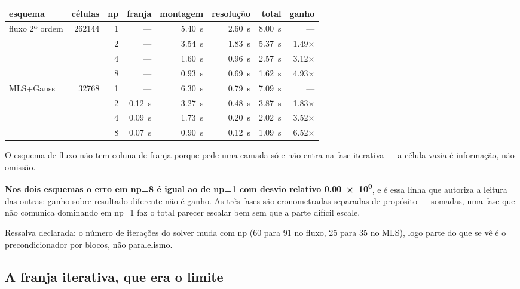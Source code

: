\begin{center}
\begin{tabular}{lrrrrrrr}
\toprule
esquema & células & np & franja & montagem & resolução & total & ganho \\
\midrule
fluxo 2ª ordem & \num{262144} & 1 & --- & \SI{5.40}{\second} & \SI{2.60}{\second} & \SI{8.00}{\second} & --- \\
               &              & 2 & --- & \SI{3.54}{\second} & \SI{1.83}{\second} & \SI{5.37}{\second} & \num{1.49}$\times$ \\
               &              & 4 & --- & \SI{1.60}{\second} & \SI{0.96}{\second} & \SI{2.57}{\second} & \num{3.12}$\times$ \\
               &              & 8 & --- & \SI{0.93}{\second} & \SI{0.69}{\second} & \SI{1.62}{\second} & \num{4.93}$\times$ \\
\midrule
MLS+Gauss      & \num{32768}  & 1 & --- & \SI{6.30}{\second} & \SI{0.79}{\second} & \SI{7.09}{\second} & --- \\
               &              & 2 & \SI{0.12}{\second} & \SI{3.27}{\second} & \SI{0.48}{\second} & \SI{3.87}{\second} & \num{1.83}$\times$ \\
               &              & 4 & \SI{0.09}{\second} & \SI{1.73}{\second} & \SI{0.20}{\second} & \SI{2.02}{\second} & \num{3.52}$\times$ \\
               &              & 8 & \SI{0.07}{\second} & \SI{0.90}{\second} & \SI{0.12}{\second} & \SI{1.09}{\second} & \num{6.52}$\times$ \\
\bottomrule
\end{tabular}
\end{center}

O esquema de fluxo não tem coluna de franja porque pede uma camada só e não
entra na fase iterativa --- a célula vazia é informação, não omissão.

\textbf{Nos dois esquemas o erro em np=8 é igual ao de np=1 com desvio relativo
\num{0.00e0}}, e é essa linha que autoriza a leitura das outras: ganho sobre
resultado diferente não é ganho. As três fases são cronometradas separadas de
propósito --- somadas, uma fase que não comunica dominando em np=1 faz o total
parecer escalar bem sem que a parte difícil escale.

Ressalva declarada: o número de iterações do solver muda com np (60 para 91 no
fluxo, 25 para 35 no MLS), logo parte do que se vê é o precondicionador por
blocos, não paralelismo.

\subsection{A franja iterativa, que era o limite}
\label{sec:par-otimiza}

